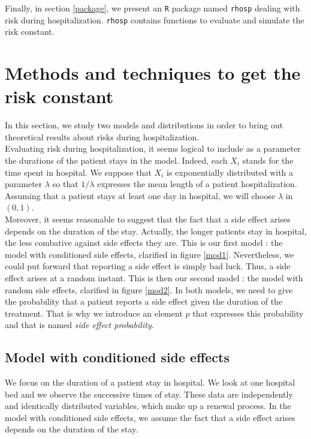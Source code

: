 \documentclass[12pt,twoside]{article}
\begin{document}
Finally, in section \ref{package}, we present an \texttt{R} package named \texttt{rhosp} dealing with risk during hospitalization. \texttt{rhosp} contains functions to evaluate and simulate the risk constant. 





\clearpage

\section{Methods and techniques to get the risk constant}
\label{methods}
In this section, we study two models and distributions in order to bring out theoretical results about risks during hospitalization.\\

Evaluating risk during hospitalization, it seems logical to include as a parameter the durations of the patient stays in the model. Indeed, each $X_i$ stands for the time spent in hospital. We suppose that $X_i$ is exponentially distributed with a parameter $\lambda$ so that 
$1/\lambda$ expresses the mean length of a patient hospitalization. Assuming that a patient stays at least one day in hospital, we will choose $\lambda$ in $(0,1)$.\\



Moreover, it seems reasonable to suggest that the fact that a side effect arises depends on the duration of the stay. Actually, the longer patients stay in hospital, the less combative against side effects they are. This is our first model : the model with conditioned side effects, clarified in figure \ref{mod1}. Nevertheless, we could put forward that reporting a side effect is simply bad luck. Thus, a side effect arises at a random instant. This is then our second model : the model with random side effects, clarified in figure \ref{mod2}. In both models, we need to give the probability that a patient reports a side effect given the duration of the treatment. That is why we introduce an element $p$ that expresses this probability and that is named \textsl{side effect probability}.


\subsection{Model with conditioned side effects}
We focus on the duration of a patient stay in hospital.  We look at one hospital bed and we observe 
the successive times of stay. These data are independently and identically distributed variables, which make 
up a renewal process. In the model with conditioned side effects, we assume the fact that a side effect arises depends on the duration of the stay.\\
\end{document}
